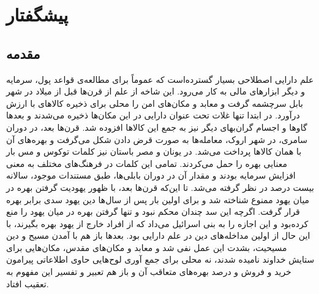 \documentclass[a4paper,titlepage,12pt,fleqn,oneside]{report}
\begin{document}
\chapter{پیشگفتار}

\section{مقدمه}
علم دارایی اصطلاحی بسیار گسترده‌است که عموماً برای مطالعه‌ی قواعد پول، سرمایه و دیگر ابزارهای مالی به کار می‌رود. این شاخه از علم از قرن‌ها قبل از میلاد در شهر بابل سرچشمه گرفت و معابد و مکان‌های امن را محلی برای ذخیره کالاهای با ارزش درآورد. در ابتدا تنها غلات تحت عنوان دارایی در این مکان‌ها ذخیره می‌شدند و بعدها گاوها و اجسام گران‌بهای دیگر نیز به جمع این کالاها افزوده شد. قرن‌ها بعد،
در دوران سامری، در شهر اروک، معامله‌ها به صورت قرض دادن شکل می‌گرفت و بهره‌های آن با همان کالاها پرداخت می‌شد. در یونان و مصر باستان نیز کلمات توکوس و مس بار معنایی بهره را حمل می‌کردند. تمامی این کلمات در فرهنگ‌های مختلف به معنی افزایش سرمایه بودند و مقدار آن در دوران بابلی‌ها، طبق مستندات موجود، سالانه بیست درصد در نظر گرفته می‌شد. تا این‌که قرن‌ها بعد، با ظهور یهودیت گرفتن بهره در میان یهود ممنوع شناخته شد و برای اولین بار پس از سال‌ها دین یهود سدی برابر بهره قرار گرفت. اگرچه این سد چندان محکم نبود و تنها گرفتن بهره در میان یهود را منع کرده‌بود و این اجازه را به بنی اسرائیل می‌داد که از افراد خارج از یهود بهره بگیرند، با این حال از اولین مداخله‌های دین در علم دارایی بود. بعدها باز هم با آمدن مسیح و دین مسیحیت، بشدت این عمل نفی شد و معابد و مکان‌های مقدس، مکان‌هایی برای ستایش خداوند نامیده شدند، نه محلی برای جمع آوری لوح‌هایی حاوی اطلاعاتی پیرامون خرید و فروش و درصد بهره‌های متعاقب آن و  باز هم تعبیر و تفسیر این مفهوم به تعقیب افتاد.
\end{document}
